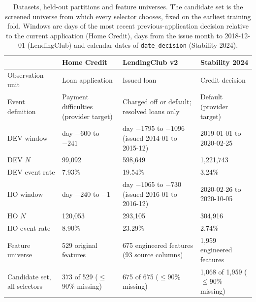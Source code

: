 \documentclass[final,5p,twocolumn]{elsarticle}
\begin{document}
\begin{table}[htbp]
\centering
\footnotesize
\begin{threeparttable}
\caption{Datasets, held-out partitions and feature universes. The candidate set is the screened universe from which every selector chooses, fixed on the earliest training fold. Windows are days of the most recent previous-application decision relative to the current application (Home Credit), days from the issue month to 2018-12-01 (LendingClub) and calendar dates of \texttt{date\_decision} (Stability 2024).}
\label{tab:datasets}
\begin{tabular}{@{}lL{29mm}L{31mm}L{31mm}@{}}
\toprule
 & Home Credit & LendingClub v2 & Stability 2024 \\
\midrule
Observation unit & Loan application & Issued loan & Credit decision \\
Event definition & Payment difficulties (provider target) & Charged off or default; resolved loans only & Default (provider target) \\
DEV window & day $-600$ to $-241$ & day $-1795$ to $-1096$ (issued 2014-01 to 2015-12) & 2019-01-01 to 2020-02-25 \\
DEV $N$ & 99,092 & 598,649 & 1,221,743 \\
DEV event rate & 7.93\% & 19.54\% & 3.24\% \\
HO window & day $-240$ to $-1$ & day $-1065$ to $-730$ (issued 2016-01 to 2016-12) & 2020-02-26 to 2020-10-05 \\
HO $N$ & 120,053 & 293,105 & 304,916 \\
HO event rate & 8.90\% & 23.29\% & 2.74\% \\
Feature universe & 529 original features & 675 engineered features (93 source columns) & 1,959 engineered features \\
Candidate set, all selectors & 373 of 529 ($\le$90\% missing) & 675 of 675 ($\le$90\% missing) & 1,068 of 1,959 ($\le$90\% missing) \\
\bottomrule
\end{tabular}
\end{threeparttable}
\end{table}
\end{document}
